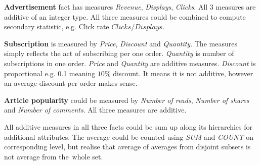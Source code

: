 

{\bf Advertisement} fact has measures {\it Revenue}, {\it Displays}, {\it Clicks}. All 3 measures are additive of an integer type. All three measures could be combined to compute secondary statistic, e.g. Click rate $Clicks / Displays$. 

{\bf Subscription} is measured by {\it Price}, {\it Discount} and {\it Quantity}. The measures simply reflects the act of subscribing per one order. {\it Quantity} is number of subscriptions in one order. {\it Price} and {\it Quantity} are additive measures. {\it Discount} is proportional e.g. 0.1 meaning $10\%$ discount. It means it is not additive, however an average discount per order makes sense.

{\bf Article popularity} could be measured by {\it Number of reads}, {\it Number of shares} and {\it Number of comments}.
All three measures are additive.

All additive measures in all three facts could be sum up along its hierarchies for additional attributes. The average could be counted using {\it SUM} and {\it COUNT} on corresponding level, but realise that average of averages from disjoint subsets is not average from the~whole set.
